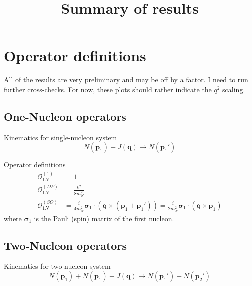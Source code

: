 \documentclass[onecolumn]{revtex4-2}
\renewcommand{\vec}[1]{\boldsymbol{#1}}
\begin{document}
\title{Summary of results}
\maketitle

\section{Operator definitions}

All of the results are very preliminary and may be off by a factor.
I need to run further cross-checks.
For now, these plots should rather indicate the $q^2$ scaling.

\subsection{One-Nucleon operators}
Kinematics for single-nucleon system
\begin{equation}
    N(\vec p_1) + J(\vec q) \to N(\vec p_1')
\end{equation}

Operator definitions
\begin{align}
    \mathcal{O}_{1N}^{(1)}
    &=
    1
    \,\\
    \mathcal{O}_{1N}^{(DF)}
    &=
    \frac{k^2}{8 m_N^2}
    \,\\
    \mathcal{O}_{1N}^{(SO)}
    &=
    \frac{i}{4 m_N^2} \vec \sigma_1 \cdot (\vec q \times (\vec p_1 + \vec p_1'))
    =
    \frac{i}{2 m_N^2} \vec \sigma_1 \cdot (\vec q \times \vec p_1 )
\end{align}
where $\vec \sigma_1$ is the Pauli (spin) matrix of the first nucleon.

\subsection{Two-Nucleon operators}

Kinematics for two-nucleon system
\begin{equation}
    N(\vec p_1) + N(\vec p_1) + J(\vec q) \to N(\vec p_1') +N(\vec p_2')
\end{equation}
\end{document}
